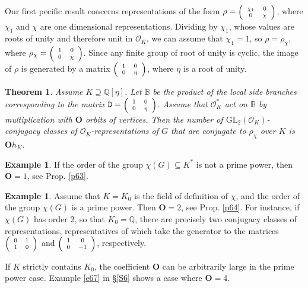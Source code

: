 \documentclass{article}
\newtheorem{Thm}{Theorem}
\theoremstyle{definition}
\newtheorem{ex}[Prop]{Example}
\theoremstyle{remark}
\newcommand\sbmattrix[4]{\textnormal{\scriptsize$\left(\begin{array}{cc}#1&#2\\#3&#4\end{array}\right)$\normalsize}}
\begin{document}
Our first pecific result concerns representations of the form $\rho=\sbmattrix{\chi_1}00{\chi}$, where $\chi_1$ and $\chi$
are one dimensional representations. Dividing by
$\chi_1$, whose values are roots of unity and therefore
unit in $\mathcal{O}_K$, we can assume that $\chi_1=1$,
so $\rho=\rho_\chi$, where $\rho_\chi=\sbmattrix100{\chi}$.
Since any finite group of root of unity is cyclic, the image
of $\rho$ is generated by a matrix $\sbmattrix100{\eta}$,
where $\eta$ is a root of unity.

 \begin{Thm}\label{t5}
    Assume $K\supseteq\mathbb{Q}[\eta]$.
    Let $\mathbb{B}$ be the product of the local
    side branches corresponding to the matrix 
    $\mathtt{D}=\sbmattrix100\eta$. Assume that
    $\mathcal{O}_K^*$ act on $\mathbb{B}$ 
    by multiplication with $\mathbf{O}$ orbits of vertices.
    Then the number of 
    $\mathrm{GL}_2(\mathcal{O}_K)$-conjugacy 
    classes of $\mathcal{O}_K$-representations of $G$ that are
    conjugate to $\rho_\chi$ over $K$ is $\mathbf{O}h_K$. 
\end{Thm}



\begin{ex}
    If the order of the group $\chi(G)\subseteq K^*$
    is not a prime power, then $\mathbf{O}=1$, see 
    Prop. \ref{p63}.
\end{ex}

\begin{ex}
    Assume that $K=K_0$ is the field of definition of $\chi$,
    and the order of the group $\chi(G)$
    is a prime power. Then $\mathbf{O}=2$, see 
    Prop. \ref{p64}. For instance, if $\chi(G)$ has order $2$, 
so that $K_0=\mathbb{Q}$, there are precisely two
conjugacy classes of representations, representatives of which
take the generator to the matrices $\sbmattrix 0110$ and 
$\sbmattrix 100{-1}$, respectively. 
\end{ex}

If $K$ strictly contains $K_0$, the coefficient 
$\mathbf{O}$ can be arbitrarily large in the prime power 
case. Example \ref{e67} in \S\ref{S6} shows a case where
$\mathbf{O}=4$.
\end{document}

